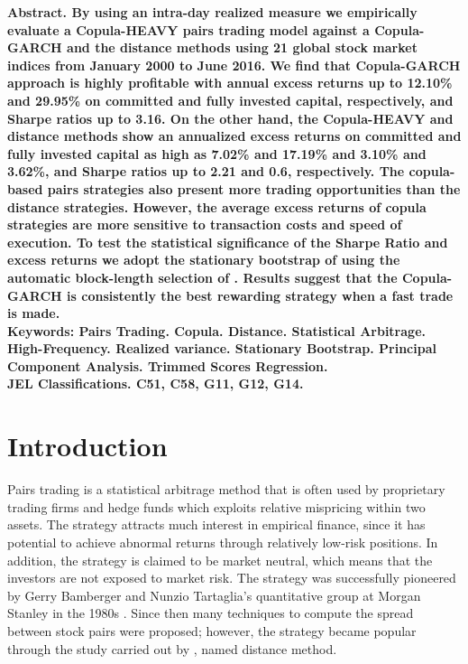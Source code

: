 \documentclass[a4paper,12pt]{report}
\begin{document}
\setlength{\baselineskip}{12pt}
\noindent\bf Abstract. \rm By using an intra-day realized measure we empirically evaluate a Copula-HEAVY pairs trading model against a Copula-GARCH and the distance methods using 21 global stock market indices from January 2000 to June 2016. We find that Copula-GARCH approach is highly profitable with annual excess returns up to 12.10\% and 29.95\% on committed and fully invested capital, respectively, and Sharpe ratios up to 3.16. On the other hand, the Copula-HEAVY and distance methods show an annualized excess returns on committed and fully invested capital as high as 7.02\% and 17.19\% and 3.10\% and 3.62\%, and Sharpe ratios up to 2.21 and 0.6, respectively. The copula-based pairs strategies also present more trading opportunities than the distance strategies. However, the average excess returns of copula strategies are more sensitive to transaction costs and speed of execution. To test the statistical significance of the Sharpe Ratio and excess returns we adopt the stationary bootstrap of \citet*{pr94} using the automatic block-length selection of \citet*{pw04}. Results suggest that the Copula-GARCH is consistently the best rewarding strategy when a fast trade is made.\\[.1in]

\noindent \bf Keywords: \rm Pairs Trading. Copula. Distance. Statistical Arbitrage. High-Frequency. Realized variance. Stationary Bootstrap. Principal Component Analysis. Trimmed Scores Regression.\\[.1in]
\noindent \bf JEL Classifications. \rm  C51, C58, G11, G12, G14.
\clearpage

\setlength{\baselineskip}{12pt}
\setcounter{footnote}{0}
\clearpage
\section{Introduction}
\label{introduction}

Pairs trading is a statistical arbitrage method that is often used by proprietary trading firms and hedge funds which exploits relative mispricing within two assets. The strategy attracts much interest in empirical finance, since it has potential to achieve abnormal returns through relatively low-risk positions. In addition, the strategy is claimed to be market neutral, which means that the investors are not exposed to market risk. The strategy was successfully pioneered by Gerry Bamberger and  Nunzio Tartaglia's quantitative group at Morgan Stanley in the 1980s \citet*{ggr06}. Since then many techniques to compute the spread between stock pairs were proposed; however, the strategy became popular through the study carried out by \citet*{ggr06}, named distance method.
\end{document}
